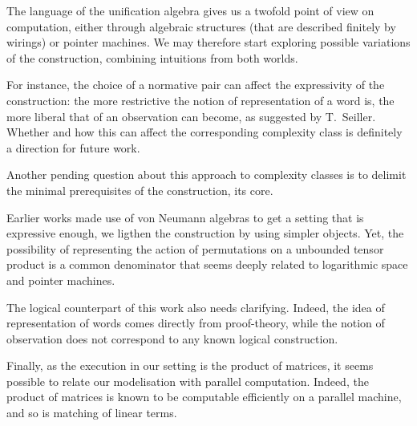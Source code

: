 The language of the unification algebra gives us a twofold point of view on computation, either through algebraic structures (that are described finitely by wirings) or pointer machines.
We may therefore start exploring possible variations of the construction, combining intuitions from both worlds.


\smallskip
For instance, the choice of a normative pair can affect the expressivity of the construction:
the more restrictive the notion of representation of a word is, the more liberal that of an observation can become, as suggested by T.~Seiller.
Whether and how this can affect the corresponding complexity class is definitely a direction for future work.





\smallskip
Another pending question about this approach to complexity classes is to delimit the minimal prerequisites of the construction, its core.

Earlier works \cite{girard_normativity_2012,aubert_characterizing_2012,seiller_logarithmic_2013} made use of von Neumann algebras to get a setting that is expressive enough, we ligthen the construction by using simpler objects.
Yet, the possibility of representing the action of permutations on a unbounded tensor product is a common denominator that seems deeply related to logarithmic space and pointer machines.

\smallskip
The logical counterpart of this work also needs clarifying.
Indeed, the idea of representation of words comes directly from proof-theory, while the notion of observation does not correspond to any known logical construction.

\smallskip
Finally, as the execution in our setting is the product of matrices, it seems possible to relate our modelisation with parallel computation. Indeed, the product of matrices is known to be computable efficiently on a parallel machine, and so is matching of linear terms.
